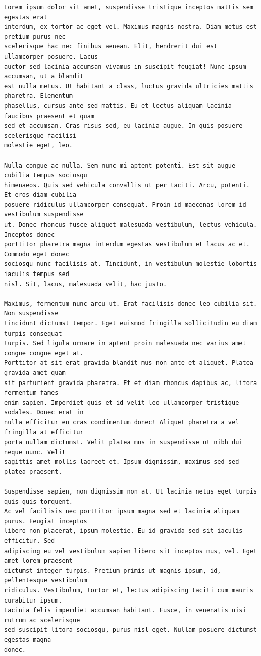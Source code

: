 \documentclass{article}
\begin{document}
\begin{verbatim}
Lorem ipsum dolor sit amet, suspendisse tristique inceptos mattis sem egestas erat
interdum, ex tortor ac eget vel. Maximus magnis nostra. Diam metus est pretium purus nec
scelerisque hac nec finibus aenean. Elit, hendrerit dui est ullamcorper posuere. Lacus
auctor sed lacinia accumsan vivamus in suscipit feugiat! Nunc ipsum accumsan, ut a blandit
est nulla metus. Ut habitant a class, luctus gravida ultricies mattis pharetra. Elementum
phasellus, cursus ante sed mattis. Eu et lectus aliquam lacinia faucibus praesent et quam
sed et accumsan. Cras risus sed, eu lacinia augue. In quis posuere scelerisque facilisi
molestie eget, leo.

Nulla congue ac nulla. Sem nunc mi aptent potenti. Est sit augue cubilia tempus sociosqu
himenaeos. Quis sed vehicula convallis ut per taciti. Arcu, potenti. Et eros diam cubilia
posuere ridiculus ullamcorper consequat. Proin id maecenas lorem id vestibulum suspendisse
ut. Donec rhoncus fusce aliquet malesuada vestibulum, lectus vehicula. Inceptos donec
porttitor pharetra magna interdum egestas vestibulum et lacus ac et. Commodo eget donec
sociosqu nunc facilisis at. Tincidunt, in vestibulum molestie lobortis iaculis tempus sed
nisl. Sit, lacus, malesuada velit, hac justo.

Maximus, fermentum nunc arcu ut. Erat facilisis donec leo cubilia sit. Non suspendisse
tincidunt dictumst tempor. Eget euismod fringilla sollicitudin eu diam turpis consequat
turpis. Sed ligula ornare in aptent proin malesuada nec varius amet congue congue eget at.
Porttitor at sit erat gravida blandit mus non ante et aliquet. Platea gravida amet quam
sit parturient gravida pharetra. Et et diam rhoncus dapibus ac, litora fermentum fames
enim sapien. Imperdiet quis et id velit leo ullamcorper tristique sodales. Donec erat in
nulla efficitur eu cras condimentum donec! Aliquet pharetra a vel fringilla at efficitur
porta nullam dictumst. Velit platea mus in suspendisse ut nibh dui neque nunc. Velit
sagittis amet mollis laoreet et. Ipsum dignissim, maximus sed sed platea praesent.

Suspendisse sapien, non dignissim non at. Ut lacinia netus eget turpis quis quis torquent.
Ac vel facilisis nec porttitor ipsum magna sed et lacinia aliquam purus. Feugiat inceptos
libero non placerat, ipsum molestie. Eu id gravida sed sit iaculis efficitur. Sed
adipiscing eu vel vestibulum sapien libero sit inceptos mus, vel. Eget amet lorem praesent
dictumst integer turpis. Pretium primis ut magnis ipsum, id, pellentesque vestibulum
ridiculus. Vestibulum, tortor et, lectus adipiscing taciti cum mauris curabitur ipsum.
Lacinia felis imperdiet accumsan habitant. Fusce, in venenatis nisi rutrum ac scelerisque
sed suscipit litora sociosqu, purus nisl eget. Nullam posuere dictumst egestas magna
donec.
\end{verbatim}
\end{document}
